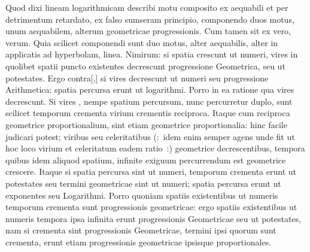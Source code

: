 \count{}
\count{}
\count{}
\pstart
Quod dixi lineam logarithmicam describi motu composito ex aequabili et per detrimentum retardato, ex falso sumseram principio,
componendo duos motus, unum aequabilem, alterum geometricae progressionis.
Cum tamen sit ex vero, verum.
Quia scilicet componendi sunt duo motus, alter aequabilis, alter in applicatis ad hyperbolam,
 linea.
\pend
\pstart
Nimirum:
si spatia crescunt ut numeri, vires in quolibet spatii puncto existentes decrescunt progressione Geometrica, seu ut potestates.
Ergo contra[,] si vires\protect{} decrescunt ut numeri seu progressione Arithmetica:
spatia percursa\protect{} erunt ut logarithmi.
Porro in ea ratione qua vires  decrescunt.
Si vires ,
nempe spatium 
percursum, nunc percurretur duplo, sunt scilicet temporum crementa virium crementis reciproca.
Itaque cum reciproca geometrice proportionalium, sint etiam geometrice proportionalia: hinc facile judicari potest;
viribus seu celeritatibus (:~idem enim semper agens unde fit ut hoc loco virium et celeritatum eadem ratio~:) geometrice decrescentibus,
tempora quibus idem aliquod spatium, infinite exiguum percurrendum est geometrice crescere.
Itaque si spatia percursa sint ut numeri, temporum crementa erunt ut potestates seu termini geometricae
sint ut numeri; spatia percursa erunt ut exponentes seu Logarithmi.
Porro quoniam spatiis existentibus ut numeris temporum crementa sunt progressionis geometricae:
ergo spatiis existentibus ut numeris tempora ipsa infinita erunt progressionis Geometricae seu ut potestates,
nam si crementa sint progressionis Geometricae, termini ipsi quorum sunt crementa, erunt etiam progressionis geometricae ipsisque proportionales.
